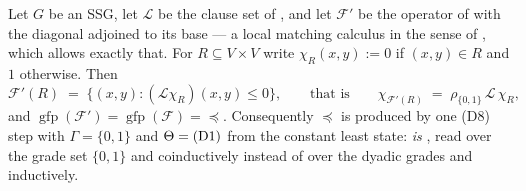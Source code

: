 \begin{theorem}\label{ob:m1-grade}
Let $G$ be an SSG, let $\mathcal L$ be the clause set of
, and let $\mathcal F'$ be the operator of
 with the diagonal adjoined to its base --- a local
matching calculus in the sense of , which allows exactly
that. For $R\subseteq V\times V$ write $\chi_R(x,y):=0$ if $(x,y)\in R$
and $1$ otherwise. Then
\[
  \mathcal F'(R)\;=\;\{(x,y):(\mathcal L\chi_R)(x,y)\le0\},
  \qquad\text{that is}\qquad
  \chi_{\mathcal F'(R)}\;=\;\rho_{\{0,1\}}\,\mathcal L\,\chi_R ,
\]
and $\operatorname{gfp}(\mathcal F')=\operatorname{gfp}(\mathcal F)=\preceq$.
Consequently $\preceq$ is produced by one \textup{(D8)} step with
$\Gamma=\{0,1\}$ and $\Theta=\textup{(D1)}$ from the constant least state:
 \emph{is} , read over the grade set
$\{0,1\}$ and coinductively instead of over the dyadic grades and
inductively.
\end{theorem}

